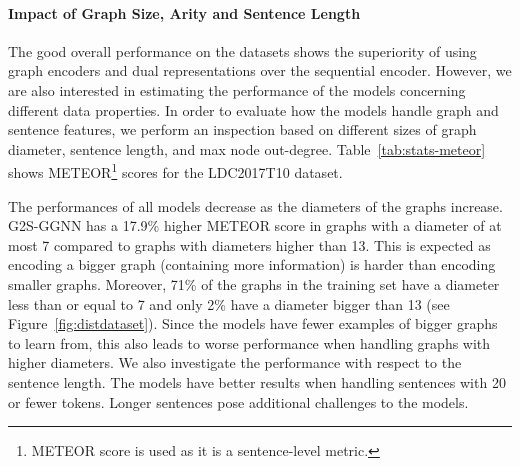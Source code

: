 \documentclass[11pt,a4paper]{article}
\begin{document}
\paragraph{Impact of Graph Size, Arity and Sentence Length}

The good overall performance on the datasets shows the superiority of using graph encoders and dual representations over the sequential encoder. However, we are also interested in estimating the performance of the models concerning different data properties. In order to evaluate how the models handle graph and sentence features, we perform an inspection based on different sizes of graph diameter, sentence length, and max node out-degree. Table~\ref{tab:stats-meteor} shows METEOR\footnote{METEOR score is used as it is a sentence-level metric.} scores for the LDC2017T10 dataset.

The performances of all models decrease as the diameters of the graphs increase. {\selectfont G2S-GGNN} has a 17.9\% higher METEOR score in graphs with a diameter of at most 7 compared to graphs with diameters higher than 13.  This is expected as encoding a bigger graph (containing more information) is harder than encoding smaller graphs. Moreover, 71\% of the graphs in the training set have a diameter less than or equal to 7 and only 2\% have a diameter bigger than 13 (see Figure~\ref{fig:distdataset}). Since the models have fewer examples of bigger graphs to learn from, this also leads to worse performance when handling graphs with higher diameters.
We also investigate the performance with respect to the sentence length. The models have better results when handling sentences with 20 or fewer tokens. Longer sentences pose additional challenges to the models.
\end{document}
